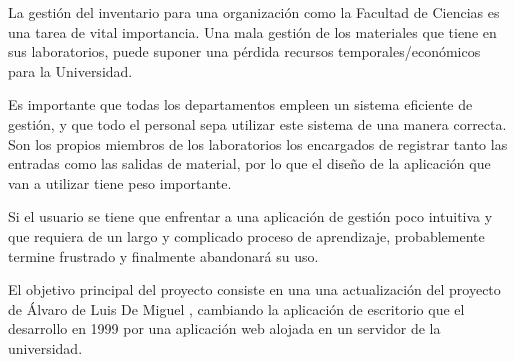 
La gestión del inventario para una organización como la Facultad de Ciencias es una tarea de vital importancia. Una mala gestión de los materiales que tiene en sus laboratorios, puede suponer una pérdida recursos temporales/económicos para la Universidad.

Es importante que todas los departamentos empleen un sistema eficiente de gestión, y que todo el personal sepa utilizar este sistema de una manera correcta. Son los propios miembros de los laboratorios los encargados de registrar tanto las entradas como las salidas de material, por lo que el diseño de la aplicación que van a utilizar tiene peso importante. 

Si el usuario se tiene que enfrentar a una aplicación de gestión poco intuitiva y que requiera de un largo y complicado proceso de aprendizaje, probablemente termine frustrado y finalmente abandonará su uso.

El objetivo principal del proyecto consiste en una una actualización del proyecto de Álvaro de Luis De Miguel \cite{GeslabV1}, cambiando la aplicación de escritorio que el desarrollo en 1999 por una aplicación web alojada en un servidor de la universidad.